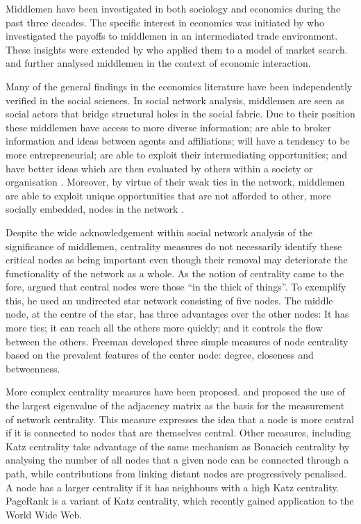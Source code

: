 \documentclass[11pt,fleqn]{article}
\begin{document}
Middlemen have been investigated in both sociology and economics during the past three decades. The specific interest in economics was initiated by \citet{KalaiMiddlemen1978} who investigated the payoffs to middlemen in an intermediated trade environment. These insights were extended by \citet{RubinsteinWolinsky1987} who applied them to a model of market search. \citet{JacksonWolinsky1996} and \citet{GillesChakrabarti2006} further analysed middlemen in the context of economic interaction.

Many of the general findings in the economics literature have been independently verified in the social sciences. In social network analysis, middlemen are seen as social actors that bridge structural holes in the social fabric. Due to their position these middlemen have access to more diverse information; are able to broker information and ideas between agents and affiliations; will have a tendency to be more entrepreneurial; are able to exploit their intermediating opportunities; and have better ideas which are then evaluated by others within a society or organisation \citep{Burt1992, Burt2004, Burt2005, Burt2010}. Moreover, by virtue of their weak ties in the network, middlemen are able to exploit unique opportunities that are not afforded to other, more socially embedded, nodes in the network \citep{Granovetter1973, Granovetter2005}.

Despite the wide acknowledgement within social network analysis of the significance of middlemen, centrality measures do not necessarily identify these critical nodes as being important even though their removal may deteriorate the functionality of the network as a whole. As the notion of centrality came to the fore, \citet[p.~219]{Freeman1979} argued that central nodes were those ``in the thick of things''. To exemplify this, he used an undirected star network consisting of five nodes. The middle node, at the centre of the star, has three advantages over the other nodes: It has more ties; it can reach all the others more quickly; and it controls the flow between the others. Freeman developed three simple measures of node centrality based on the prevalent features of the center node: degree, closeness and betweenness.

More complex centrality measures have been proposed. \citet{Bonacich1972,Bonacich1987} and \citet{Bonacich2001} proposed the use of the largest eigenvalue of the adjacency matrix as the basis for the measurement of network centrality. This measure expresses the idea that a node is more central if it is connected to nodes that are themselves central. Other measures, including Katz centrality \citep{Katz1953} take advantage of the same mechanism as Bonacich centrality by analysing the number of all nodes that a given node can be connected through a path, while contributions from linking distant nodes are progressively penalised. A node has a larger centrality if it has neighbours with a high Katz centrality. PageRank \citep{BrinPage1998} is a variant of Katz centrality, which recently gained application to the World Wide Web.
\end{document}
